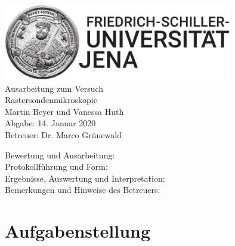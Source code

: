 \documentclass[a4paper,twoside,final]{article}
\begin{document}
\setlength{\marginparsep}{2em}
\renewcommand{\theequation}{\arabic{section}.\arabic{equation}}
\renewcommand{\thefigure}{\arabic{section}.\arabic{figure}}
\renewcommand{\thetable}{\arabic{section}.\arabic{table}}

\begin{center}
\thispagestyle{empty}
  \includegraphics[width=0.75\textwidth]{../UniJena_BildWortMarke_black.pdf}\\[4em]
  \Large
  Ausarbeitung zum Versuch\\[2em]
  \Huge
  Rastersondenmikroskopie\\
  \vspace{2cm}
  \Large
  Martin Beyer und Vanessa Huth\\[2em]
  Abgabe: 14. Januar 2020\\[2em]
  Betreuer: Dr. Marco Grünewald\\[5em]
  \begin{flushleft}
  	Bewertung und Ausarbeitung:\\[2em]
		Protokollführung und Form:\\[1em]
		Ergebnisse, Auswertung und Interpretation:\\[1em]
		Bemerkungen und Hinweise des Betreuers:
  \end{flushleft}
\end{center}
\clearpage

\pagestyle{fancy}
\renewcommand{\headrulewidth}{0pt}
\renewcommand{\footrulewidth}{0.5pt}
\renewcommand{\sectionmark}[1]{\markright{#1}}
\fancyhead[RE,LO]{\rightmark}
\fancyfoot[LE,RO]{\bfseries\thepage}
\renewcommand{\headrulewidth}{0.5pt}
\renewcommand{\footrulewidth}{0.5pt}

\setcounter{equation}{0}
\setcounter{figure}{0}

\tableofcontents
\newpage
\section{Aufgabenstellung} \label{sec:Aufgabenstellung}
\end{document}
